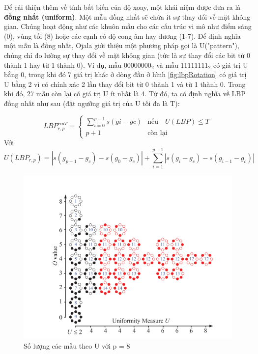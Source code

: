 Để cải thiện thêm về tính bất biến của độ xoay, một khái niệm được đưa ra là \textbf{đồng nhất (uniform)}. Một mẫu đồng nhất sẽ chứa ít sự thay đổi về mặt không gian. Chúng hoạt động như các khuôn mẫu cho các cấu trúc vi mô như điểm sáng (0), vùng tối (8) hoặc các cạnh có độ cong âm hay dương (1-7). Để định nghĩa một mẫu là đồng nhất, Ojala giới thiệu một phương pháp gọi là U("pattern"), chúng chỉ đo lường sự thay đổi về mặt không gian (tức là sự thay đổi các bit từ 0 thành 1 hay từ 1 thành 0). Ví dụ, mẫu $00000000_2$ và mẫu $11111111_2$ có giá trị U bằng 0, trong khi đó 7 giá trị khác ở dòng đầu ở hình \ref{fig:lbpRotation}
 có giá trị U bằng 2 vì có chính xác 2 lần thay đổi bit từ 0 thành 1 và từ 1 thành 0. Trong khi đó, 27 mẫu còn lại có giá trị U ít nhất là 4. Từ đó, ta có định nghĩa về LBP đồng nhất như sau (đặt ngưỡng giá trị của U tối đa là T):

 \begin{equation}
     LBP_{r, p}^{riuT} = 
     \begin{cases}
         \sum_{i=0}^{p-1}s(gi - gc)  & \text{nếu} \quad U(LBP) \leq T
         \\
         p+1 & \text{còn lại}
     \end{cases}
     \label{eq:riu2}
 \end{equation}
 Với
 \begin{equation}
     U(LBP_{r, p}) = | s(g_{p-1} - g_c) - s(g_0 -g_c)| + \sum_{i = 1}^{p-1}|s(g_i - g_c) - s(g_{i-1} - g_c)| 
 \end{equation}
 
\begin{figure} [h]
	\centering
	\includegraphics[width= 0.8\linewidth]{figures/lbpU.png}
	\caption{Số lượng các mẫu theo U với p = 8 \cite{Liu2016}}
	\label{fig:lbpU}
\end{figure} 


